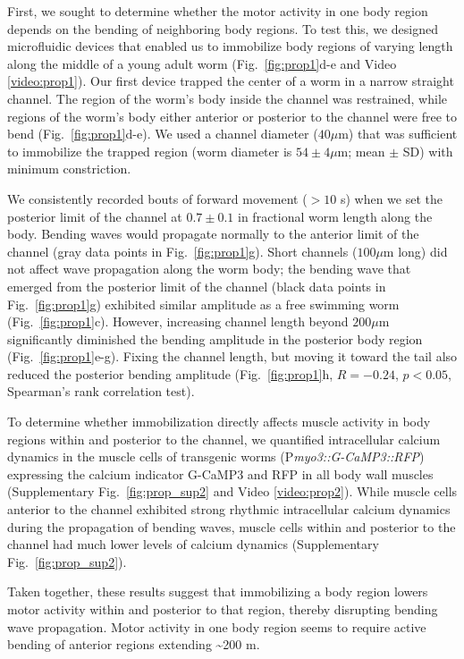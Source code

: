 First, we sought to determine whether the motor activity in one body region depends on the 
bending of neighboring body regions. To test this, we designed microfluidic devices that enabled 
us to immobilize body regions of varying length along the middle of a young adult worm (Fig.~\ref{fig:prop1}d-e and Video \ref{video:prop1}). Our first device trapped the center of a worm in a narrow 
straight channel. The region of the worm's body inside the channel was restrained, while  regions of the worm's body either anterior or 
posterior to the channel were free to bend (Fig.~\ref{fig:prop1}d-e). We used a channel diameter ($40 \mu$m) that was sufficient to 
immobilize the trapped region (worm diameter is $54 \pm 4 \mu$m; mean $\pm$ SD) with minimum 
constriction.  

We consistently recorded bouts of forward movement ($> 10$ s) when we set the posterior limit of 
the channel at $0.7 \pm 0.1$ in fractional worm length along the body. Bending waves would 
propagate normally to the anterior limit of the channel (gray data points in Fig.~\ref{fig:prop1}g). Short 
channels ($100 \mu$m long) did not affect wave propagation along the worm body; the bending wave 
that emerged from the posterior limit of the channel (black data points in Fig.~\ref{fig:prop1}g) exhibited 
similar amplitude as a free swimming worm (Fig.~\ref{fig:prop1}c). However, increasing channel length 
beyond $200 \mu$m significantly diminished the bending amplitude in the posterior body region (Fig.~\ref{fig:prop1}e-g). Fixing the channel length, but moving it toward the tail also reduced the posterior 
bending amplitude (Fig.~\ref{fig:prop1}h, $R = -0.24$, $p < 0.05$, Spearman’s rank correlation test).

To determine whether immobilization directly affects muscle activity in body regions within and 
posterior to the channel, we quantified intracellular calcium dynamics in the muscle cells of 
transgenic worms (P\textit{myo3::G-CaMP3::RFP}) expressing the calcium indicator G-CaMP3 \citep{tian_imaging_2009} and RFP in all body wall muscles (Supplementary Fig.~\ref{fig:prop_sup2} and Video \ref{video:prop2}). While 
muscle cells anterior to the channel exhibited strong rhythmic intracellular calcium dynamics 
during the propagation of bending waves, muscle cells within and posterior to the channel had 
much lower levels of calcium dynamics (Supplementary Fig.~\ref{fig:prop_sup2}).

Taken together, these results suggest that immobilizing a body region lowers motor activity 
within and posterior to that region, thereby disrupting bending wave propagation. Motor activity 
in one body region seems to require active bending of anterior regions extending \textasciitilde200 \textmu m.


